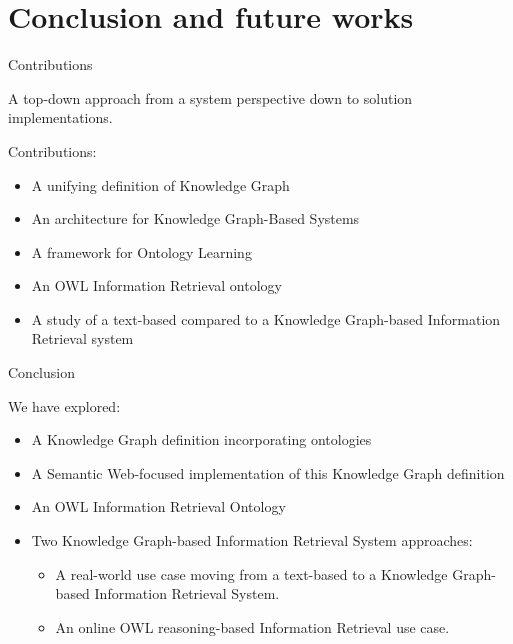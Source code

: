 \section[Conclusion]{Conclusion and future works}

\begin{frame}{Contributions}

    \begin{center}
        A top-down approach from a system perspective down to solution implementations.
    \end{center}

    Contributions:
    \begin{itemize}
        \item A unifying definition of Knowledge Graph
        \item An architecture for Knowledge Graph-Based Systems
        \item A framework for Ontology Learning
        \item An OWL Information Retrieval ontology
        \item A study of a text-based compared to a Knowledge Graph-based Information Retrieval system
    \end{itemize}
    
\end{frame}

\begin{frame}{Conclusion}

    We have explored:
    \begin{itemize}
        \item A Knowledge Graph definition incorporating ontologies
        \item A Semantic Web-focused implementation of this Knowledge Graph definition
        \item An OWL Information Retrieval Ontology
        \item Two Knowledge Graph-based Information Retrieval System approaches:
        \begin{itemize}
            \item A real-world use case moving from a text-based to a Knowledge Graph-based Information Retrieval System.
            \item An online OWL reasoning-based Information Retrieval use case.
        \end{itemize}
    \end{itemize}

\end{frame}

